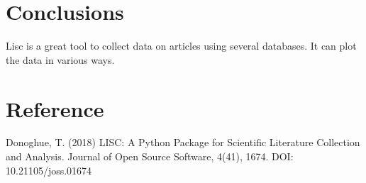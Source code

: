 \documentclass[12pt, letterpaper]{article}
\begin{document}
\section{Conclusions}

Lisc is a great tool to collect data on articles using several databases. It can plot the data in various ways.

\section{Reference}

Donoghue, T. (2018) LISC: A Python Package for Scientific Literature Collection and Analysis. Journal of Open Source Software, 4(41), 1674. DOI: 10.21105/joss.01674
\end{document}
